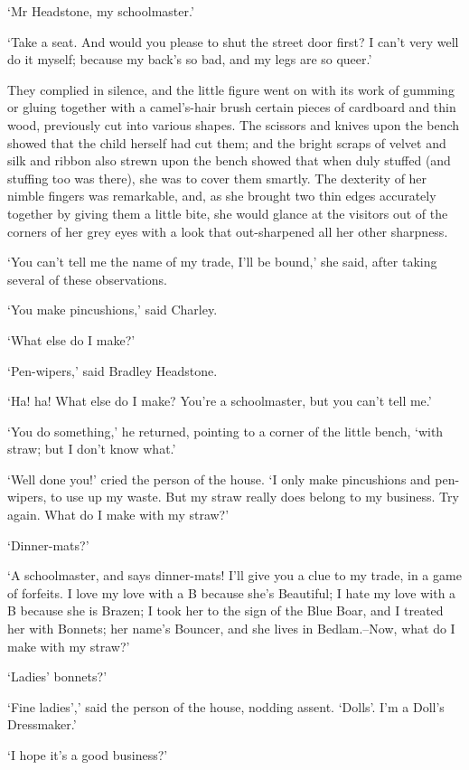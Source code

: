 ‘Mr Headstone, my schoolmaster.’

‘Take a seat. And would you please to shut the street door first? I
can’t very well do it myself; because my back’s so bad, and my legs are
so queer.’

They complied in silence, and the little figure went on with its work of
gumming or gluing together with a camel’s-hair brush certain pieces
of cardboard and thin wood, previously cut into various shapes. The
scissors and knives upon the bench showed that the child herself had cut
them; and the bright scraps of velvet and silk and ribbon also strewn
upon the bench showed that when duly stuffed (and stuffing too was
there), she was to cover them smartly. The dexterity of her nimble
fingers was remarkable, and, as she brought two thin edges accurately
together by giving them a little bite, she would glance at the visitors
out of the corners of her grey eyes with a look that out-sharpened all
her other sharpness.

‘You can’t tell me the name of my trade, I’ll be bound,’ she said, after
taking several of these observations.

‘You make pincushions,’ said Charley.

‘What else do I make?’

‘Pen-wipers,’ said Bradley Headstone.

‘Ha! ha! What else do I make? You’re a schoolmaster, but you can’t tell
me.’

‘You do something,’ he returned, pointing to a corner of the little
bench, ‘with straw; but I don’t know what.’

‘Well done you!’ cried the person of the house. ‘I only make pincushions
and pen-wipers, to use up my waste. But my straw really does belong to
my business. Try again. What do I make with my straw?’

‘Dinner-mats?’

‘A schoolmaster, and says dinner-mats! I’ll give you a clue to my trade,
in a game of forfeits. I love my love with a B because she’s Beautiful;
I hate my love with a B because she is Brazen; I took her to the sign of
the Blue Boar, and I treated her with Bonnets; her name’s Bouncer, and
she lives in Bedlam.--Now, what do I make with my straw?’

‘Ladies’ bonnets?’

‘Fine ladies’,’ said the person of the house, nodding assent. ‘Dolls’.
I’m a Doll’s Dressmaker.’

‘I hope it’s a good business?’

